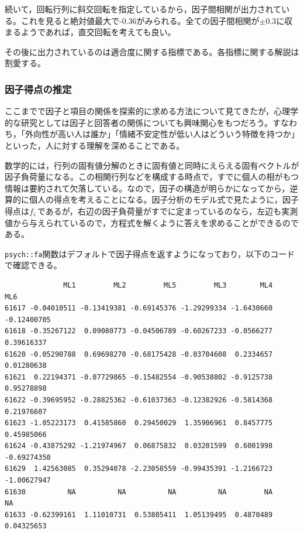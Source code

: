 \documentclass[
  a4paper,
]{ltjsbook}
\newenvironment{Shaded}{\begin{snugshade}}{\end{snugshade}}
\newcommand{\DecValTok}[1]{\textcolor[rgb]{0.68,0.00,0.00}{#1}}
\newcommand{\FunctionTok}[1]{\textcolor[rgb]{0.28,0.35,0.67}{#1}}
\newcommand{\NormalTok}[1]{\textcolor[rgb]{0.00,0.23,0.31}{#1}}
\newcommand{\SpecialCharTok}[1]{\textcolor[rgb]{0.37,0.37,0.37}{#1}}
\begin{document}
続いて，回転行列に斜交回転を指定しているから，因子間相関が出力されている。これを見ると絶対値最大で-0.36がみられる。全ての因子間相関が\(\pm 0.3\)に収まるようであれば，直交回転を考えても良い。

その後に出力されているのは適合度に関する指標である。各指標に関する解説は割愛する。

\subsubsection{因子得点の推定}\label{ux56e0ux5b50ux5f97ux70b9ux306eux63a8ux5b9a}

ここまでで因子と項目の関係を探索的に求める方法について見てきたが，心理学的な研究としては因子と回答者の関係についても興味関心をもつだろう。すなわち，「外向性が高い人は誰か」「情緒不安定性が低い人はどういう特徴を持つか」といった，人に対する理解を深めることである。

数学的には，行列の固有値分解のときに固有値と同時にえらえる固有ベクトルが因子負荷量になる。この相関行列などを構成する時点で，すでに個人の相がもつ情報は要約されて欠落している。なので，因子の構造が明らかになってから，逆算的に個人の得点を考えることになる。因子分析のモデル式で見たように，因子得点は\(f_{i.}\)であるが，右辺の因子負荷量がすでに定まっているのなら，左辺も実測値から与えられているので，方程式を解くように答えを求めることができるのである。

\texttt{psych::fa}関数はデフォルトで因子得点を返すようになっており，以下のコードで確認できる。

\begin{Shaded}
\end{Shaded}

\begin{verbatim}
              ML1         ML2         ML5         ML3        ML4         ML6
61617 -0.04010511 -0.13419381 -0.69145376 -1.29299334 -1.6430660 -0.12400705
61618 -0.35267122  0.09080773 -0.04506789 -0.60267233 -0.0566277  0.39616337
61620 -0.05290788  0.69698270 -0.68175428 -0.03704608  0.2334657  0.01280638
61621  0.22194371 -0.07729865 -0.15482554 -0.90538802 -0.9125738  0.95278898
61622 -0.39695952 -0.28825362 -0.61037363 -0.12382926 -0.5814368  0.21976607
61623 -1.05223173  0.41585860  0.29450029  1.35906961  0.8457775  0.45985066
61624 -0.43875292 -1.21974967  0.06875832  0.03201599  0.6001998 -0.69274350
61629  1.42563085  0.35294078 -2.23058559 -0.99435391 -1.2166723 -1.00627947
61630          NA          NA          NA          NA         NA          NA
61633 -0.62399161  1.11010731  0.53805411  1.05139495  0.4870489  0.04325653
\end{verbatim}
\end{document}
